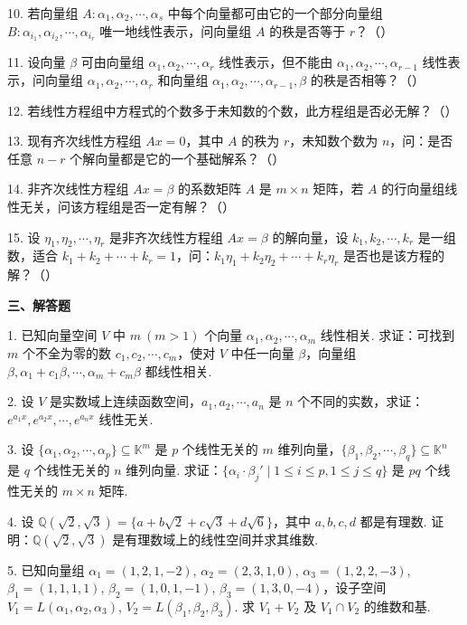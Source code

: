 \documentclass[UTF8, 12pt, fontset=fandol, oneside]{ctexart}
\begin{document}
10. 若向量组 $A:\alpha_1,\alpha_2,\cdots,\alpha_s$ 中每个向量都可由它的一个部分向量组 $B:\alpha_{i_1},\alpha_{i_2},\cdots,\alpha_{i_r}$ 唯一地线性表示，问向量组 $A$ 的秩是否等于 $r$？（\quad）

11. 设向量 $\beta$ 可由向量组 $\alpha_1,\alpha_2,\cdots,\alpha_r$ 线性表示，但不能由 $\alpha_1,\alpha_2,\cdots,\alpha_{r-1}$ 线性表示，问向量组 $\alpha_1,\alpha_2,\cdots,\alpha_r$ 和向量组 $\alpha_1,\alpha_2,\cdots,\alpha_{r-1},\beta$ 的秩是否相等？（\quad）

12. 若线性方程组中方程式的个数多于未知数的个数，此方程组是否必无解？（\quad）

13. 现有齐次线性方程组 $Ax=0$，其中 $A$ 的秩为 $r$，未知数个数为 $n$，问：是否任意 $n-r$ 个解向量都是它的一个基础解系？（\quad）

14. 非齐次线性方程组 $Ax=\beta$ 的系数矩阵 $A$ 是 $m\times n$ 矩阵，若 $A$ 的行向量组线性无关，问该方程组是否一定有解？（\quad）

15. 设 $\eta_1,\eta_2,\cdots,\eta_r$ 是非齐次线性方程组 $Ax=\beta$ 的解向量，设 $k_1,k_2,\cdots,k_r$ 是一组数，适合 $k_1+k_2+\cdots+k_r=1$，问：$k_1\eta_1+k_2\eta_2+\cdots+k_r\eta_r$ 是否也是该方程的解？（\quad）

\noindent\textbf{三、解答题}

1. 已知向量空间 $V$ 中 $m\ (m>1)$ 个向量 $\alpha_1,\alpha_2,\cdots,\alpha_m$ 线性相关. 求证：可找到 $m$ 个不全为零的数 $c_1,c_2,\cdots,c_m$，使对 $V$ 中任一向量 $\beta$，向量组 $\beta,\alpha_1+c_1\beta,\cdots,\alpha_m+c_m\beta$ 都线性相关.

2. 设 $V$ 是实数域上连续函数空间，$a_1,a_2,\cdots,a_n$ 是 $n$ 个不同的实数，求证：$e^{a_1x},e^{a_2x},\cdots,e^{a_nx}$ 线性无关.

3. 设 $\{\alpha_1,\alpha_2,\cdots,\alpha_p\}\subseteq\mathbb{K}^m$ 是 $p$ 个线性无关的 $m$ 维列向量，$\{\beta_1,\beta_2,\cdots,\beta_q\}\subseteq\mathbb{K}^n$ 是 $q$ 个线性无关的 $n$ 维列向量. 求证：$\{\alpha_i\cdot\beta_j'\mid 1\le i\le p,1\le j\le q\}$ 是 $pq$ 个线性无关的 $m\times n$ 矩阵.

4. 设 $\mathbb{Q}(\sqrt{2},\sqrt{3})=\{a+b\sqrt{2}+c\sqrt{3}+d\sqrt{6}\}$，其中 $a,b,c,d$ 都是有理数. 证明：$\mathbb{Q}(\sqrt{2},\sqrt{3})$ 是有理数域上的线性空间并求其维数.

5. 已知向量组 $\alpha_1=(1,2,1,-2)$, $\alpha_2=(2,3,1,0)$, $\alpha_3=(1,2,2,-3)$, $\beta_1=(1,1,1,1)$, $\beta_2=(1,0,1,-1)$, $\beta_3=(1,3,0,-4)$，设子空间 $V_1=L(\alpha_1,\alpha_2,\alpha_3)$, $V_2=L(\beta_1,\beta_2,\beta_3)$. 求 $V_1+V_2$ 及 $V_1\cap V_2$ 的维数和基.
\end{document}

